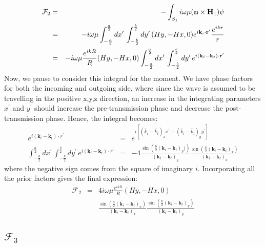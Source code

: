 \documentclass[a4article,12pt]{article}
\newcommand{\kvec}[0]{{\mathbf k}}
\newcommand{\rvecp}[0]{{\mathbf r}^{\prime}}
\begin{document}
\begin{eqnarray}
{\mathcal F}_2 & = & -\int_{S_1} i \omega \mu (\mathbf{n} \times \mathbf{H}_1) \psi \\
& = & -i \omega \mu  \int_{-\frac{a}{2}}^{\frac{a}{2}} dx^{\prime} \, \int_{-\frac{b}{2}}^{\frac{b}{2}} dy^{\prime} \, (Hy, -Hx,0) e^{i {\textbf k}_i \cdot {\textbf r}^{\prime}} \frac{e^{i k r}}{r} \\
& = & -i \omega \mu \frac{e^{i k R}}{R} (Hy, -Hx,0) \int_{-\frac{a}{2}}^{\frac{a}{2}} dx^{\prime} \, \int_{-\frac{b}{2}}^{\frac{b}{2}} dy^{\prime} \, e^{i (\kvec_i-\kvec_t) \cdot \rvecp}
\end{eqnarray}
%
Now, we pause to consider this integral for the moment. We have phase factors for both the incoming and outgoing side, where since the wave is assumed to be travelling in the positive x,y,z direction, an increase in the integrating parameters $x^{\prime}$ and $y^{\prime}$ should increase the pre-transmission phase and decrease the post-transmission phase. Hence, the integral becomes:
%
\begin{eqnarray}
e^{i (\kvec_i-\kvec_t) \cdot r^{\prime}} & = & e^{i \left[ (\hat{k}_i-\hat{k}_t)_x x^{\prime} + (\hat{k}_i-\hat{k}_t)_y y^{\prime} \right]} \\
\int_{-\frac{a}{2}}^{\frac{a}{2}} dx^{\prime} \, \int_{-\frac{b}{2}}^{\frac{b}{2}} dy^{\prime} \, e^{i (\kvec_i-\kvec_t) \cdot r^{\prime}} & = & - 4 \frac{\sin \left(\frac{b}{2}( \kvec_i - \kvec_t )_y) \right)}{( \kvec_i - \kvec_t )_y} \frac{\sin \left(\frac{a}{2} (\kvec_i - \kvec_t )_x \right)}{( \kvec_i - \kvec_t )_x}
\end{eqnarray}
%
where the negative sign comes from the square of imaginary $i$. Incorporating all the prior factors gives the final expression:
%
\begin{eqnarray}
{\mathcal F}_2 & = & 4i \omega \mu \frac{e^{i k R}}{R} (Hy, -Hx,0)  \nonumber \\
& &  \frac{\sin \left(\frac{a}{2} ( \kvec_i - \kvec_t )_x \right)}{( \kvec_i - \kvec_t )_x} \frac{\sin \left( \frac{b}{2}( \kvec_i - \kvec_t )_y \right)}{(\kvec_i - \kvec_t )_y}
\end{eqnarray}
%

\subsection{${\mathcal F}_3$}
\end{document}

